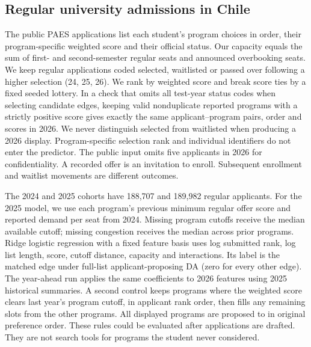 \subsection{Regular university admissions in Chile}\label{app:paes}
The public PAES applications list each student's program choices in order, their program-specific weighted score and their official status. Our capacity equals the sum of first- and second-semester regular seats and announced overbooking seats. We keep regular applications coded selected, waitlisted or passed over following a higher selection (24, 25, 26). We rank by weighted score and break score ties by a fixed seeded lottery. In a check that omits all test-year status codes when selecting candidate edges, keeping valid nonduplicate reported programs with a strictly positive score gives exactly the same applicant--program pairs, order and scores in 2026. We never distinguish selected from waitlisted when producing a 2026 display. Program-specific selection rank and individual identifiers do not enter the predictor. The public input omits five applicants in 2026 for confidentiality. A recorded offer is an invitation to enroll. Subsequent enrollment and waitlist movements are different outcomes.

The 2024 and 2025 cohorts have 188,707 and 189,982 regular applicants. For the 2025 model, we use each program's previous minimum regular offer score and reported demand per seat from 2024. Missing program cutoffs receive the median available cutoff; missing congestion receives the median across prior programs. Ridge logistic regression with a fixed feature basis uses log submitted rank, log list length, score, cutoff distance, capacity and interactions. Its label is the matched edge under full-list applicant-proposing DA (zero for every other edge). The year-ahead run applies the same coefficients to 2026 features using 2025 historical summaries. A second control keeps programs where the weighted score clears last year's program cutoff, in applicant rank order, then fills any remaining slots from the other programs. All displayed programs are proposed to in original preference order. These rules could be evaluated after applications are drafted. They are not search tools for programs the student never considered.

